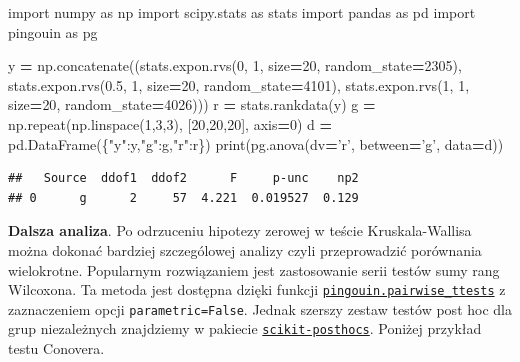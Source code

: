 \documentclass[polish,]{book}
\newenvironment{Shaded}{\begin{snugshade}}{\end{snugshade}}
\newcommand{\BuiltInTok}[1]{#1}
\newcommand{\DecValTok}[1]{\textcolor[rgb]{0.00,0.00,0.81}{#1}}
\newcommand{\FloatTok}[1]{\textcolor[rgb]{0.00,0.00,0.81}{#1}}
\newcommand{\ImportTok}[1]{#1}
\newcommand{\NormalTok}[1]{#1}
\newcommand{\OperatorTok}[1]{\textcolor[rgb]{0.81,0.36,0.00}{\textbf{#1}}}
\newcommand{\StringTok}[1]{\textcolor[rgb]{0.31,0.60,0.02}{#1}}
\begin{document}
\begin{Shaded}
\begin{Highlighting}[]
\ImportTok{import}\NormalTok{ numpy }\ImportTok{as}\NormalTok{ np}
\ImportTok{import}\NormalTok{ scipy.stats }\ImportTok{as}\NormalTok{ stats}
\ImportTok{import}\NormalTok{ pandas }\ImportTok{as}\NormalTok{ pd}
\ImportTok{import}\NormalTok{ pingouin }\ImportTok{as}\NormalTok{ pg}

\NormalTok{y }\OperatorTok{=}\NormalTok{ np.concatenate((stats.expon.rvs(}\DecValTok{0}\NormalTok{, }\DecValTok{1}\NormalTok{, size}\OperatorTok{=}\DecValTok{20}\NormalTok{, random_state}\OperatorTok{=}\DecValTok{2305}\NormalTok{),}
\NormalTok{                    stats.expon.rvs(}\FloatTok{0.5}\NormalTok{, }\DecValTok{1}\NormalTok{, size}\OperatorTok{=}\DecValTok{20}\NormalTok{, random_state}\OperatorTok{=}\DecValTok{4101}\NormalTok{),}
\NormalTok{                    stats.expon.rvs(}\DecValTok{1}\NormalTok{, }\DecValTok{1}\NormalTok{, size}\OperatorTok{=}\DecValTok{20}\NormalTok{, random_state}\OperatorTok{=}\DecValTok{4026}\NormalTok{)))}
\NormalTok{r }\OperatorTok{=}\NormalTok{ stats.rankdata(y)}
\NormalTok{g }\OperatorTok{=}\NormalTok{ np.repeat(np.linspace(}\DecValTok{1}\NormalTok{,}\DecValTok{3}\NormalTok{,}\DecValTok{3}\NormalTok{), [}\DecValTok{20}\NormalTok{,}\DecValTok{20}\NormalTok{,}\DecValTok{20}\NormalTok{], axis}\OperatorTok{=}\DecValTok{0}\NormalTok{)}
\NormalTok{d }\OperatorTok{=}\NormalTok{ pd.DataFrame(\{}\StringTok{"y"}\NormalTok{:y,}\StringTok{"g"}\NormalTok{:g,}\StringTok{"r"}\NormalTok{:r\})}
\BuiltInTok{print}\NormalTok{(pg.anova(dv}\OperatorTok{=}\StringTok{'r'}\NormalTok{, between}\OperatorTok{=}\StringTok{'g'}\NormalTok{, data}\OperatorTok{=}\NormalTok{d))}
\end{Highlighting}
\end{Shaded}

\begin{verbatim}
##   Source  ddof1  ddof2      F     p-unc    np2
## 0      g      2     57  4.221  0.019527  0.129
\end{verbatim}

\textbf{Dalsza analiza}. Po odrzuceniu hipotezy zerowej w teście Kruskala-Wallisa można dokonać bardziej szczególowej analizy czyli przeprowadzić porównania wielokrotne. Popularnym rozwiązaniem jest zastosowanie serii testów sumy rang Wilcoxona. Ta metoda jest dostępna dzięki funkcji \href{https://pingouin-stats.org/generated/pingouin.pairwise_ttests.html\#pingouin.pairwise_ttests}{\texttt{pingouin.pairwise\_ttests}} z zaznaczeniem opcji \texttt{parametric=False}. Jednak szerszy zestaw testów post hoc dla grup niezależnych znajdziemy w pakiecie \href{https://scikit-posthocs.readthedocs.io/en/latest/intro/}{\texttt{scikit-posthocs}}. Poniżej przykład testu Conovera.
\end{document}

